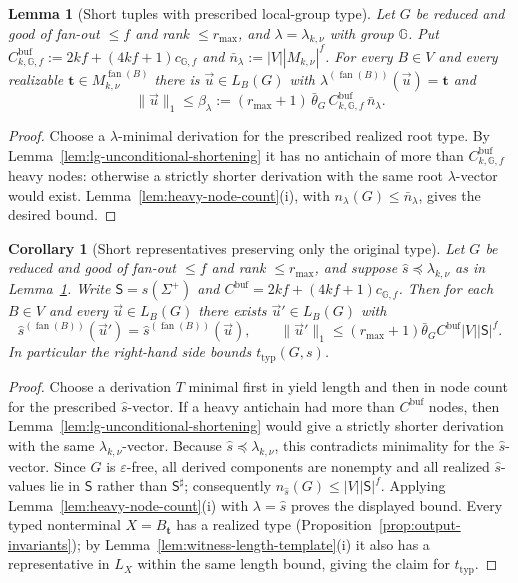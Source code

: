 \documentclass[11pt]{article}
\numberwithin{equation}{section}
\theoremstyle{plain}
\newtheorem{lemma}[theorem]{Lemma}
\newtheorem{corollary}[theorem]{Corollary}
\theoremstyle{definition}
\theoremstyle{remark}
\newcommand{\tuple}[1]{\vec{#1}}
\newcommand{\eps}{\varepsilon}
\newcommand{\fan}{\operatorname{fan}}
\theoremstyle{plain}
\begin{document}
\begin{lemma}[Short tuples with prescribed local-group type]
\label{lem:local-group-shortest}
Let $G$ be reduced and good of fan-out $\le f$ and rank $\le r_{\max}$, and
$\lambda=\lambda_{k,\nu}$ with group ${\mathbb G}$.  Put
$C^{\mathrm{buf}}_{k,{\mathbb G},f}:=2kf+(4kf+1)c_{{\mathbb G},f}$ and
$\bar n_\lambda:=|V||M_{k,\nu}|^f$.  For every $B\in V$ and every realizable
$\mathbf t\in M_{k,\nu}^{\fan(B)}$ there is $\tuple u\in L_B(G)$ with
$\lambda^{(\fan(B))}(\tuple u)=\mathbf t$ and
\[
 \|\tuple u\|_1\le\beta_\lambda:=(r_{\max}+1)\,\bar\theta_G\,
 C^{\mathrm{buf}}_{k,{\mathbb G},f}\,\bar n_\lambda .
\]
\end{lemma}

\begin{proof}
Choose a $\lambda$-minimal derivation for the prescribed realized
root type. By Lemma~\ref{lem:lg-unconditional-shortening} it
has no antichain of more than
$C^{\mathrm{buf}}_{k,\mathbb G,f}$ heavy nodes: otherwise a
strictly shorter derivation with the same root $\lambda$-vector
would exist. Lemma~\ref{lem:heavy-node-count}(i), with
$n_\lambda(G)\le\bar n_\lambda$, gives the desired bound.
\end{proof}

\begin{corollary}[Short representatives preserving only the original type]
\label{cor:lg-type-level-shortest}
Let $G$ be reduced and good of fan-out $\le f$ and rank $\le r_{\max}$,
and suppose $\widehat s\preceq\lambda_{k,\nu}$ as in
Lemma~\ref{lem:local-group-shortest}.  Write $\mathsf S=s(\Sigma^+)$ and
$C^{\mathrm{buf}}=2kf+(4kf+1)c_{{\mathbb G},f}$.  Then for each $B\in V$
and every $\tuple u\in L_B(G)$ there exists $\tuple u'\in L_B(G)$ with
\[
 \widehat s^{(\fan(B))}(\tuple u')=
 \widehat s^{(\fan(B))}(\tuple u),\qquad
 \|\tuple u'\|_1\le
 (r_{\max}+1)\bar\theta_G C^{\mathrm{buf}}|V||\mathsf S|^f.
\]
In particular the right-hand side bounds $t_{\mathrm{typ}}(G,s)$.
\end{corollary}

\begin{proof}
Choose a derivation $T$ minimal first in yield length and then
in node count for the prescribed $\widehat s$-vector. If a heavy
antichain had more than $C^{\mathrm{buf}}$ nodes, then
Lemma~\ref{lem:lg-unconditional-shortening} would give a
strictly shorter derivation with the same $\lambda_{k,\nu}$-vector.
Because $\widehat s\preceq\lambda_{k,\nu}$, this contradicts
minimality for the $\widehat s$-vector. Since $G$ is $\eps$-free,
all derived components are nonempty and all realized
$\widehat s$-values lie in $\mathsf S$ rather than
$\mathsf S^\sharp$; consequently
$n_{\widehat s}(G)\le|V||\mathsf S|^f$.
Applying Lemma~\ref{lem:heavy-node-count}(i) with
$\lambda=\widehat s$ proves the displayed bound.
Every typed nonterminal $X=B_{\mathbf t}$ has a realized type
(Proposition~\ref{prop:output-invariants}); by
Lemma~\ref{lem:witness-length-template}(i) it also has a
representative in $L_X$ within the same length bound, giving
the claim for $t_{\mathrm{typ}}$.
\end{proof}
\end{document}

